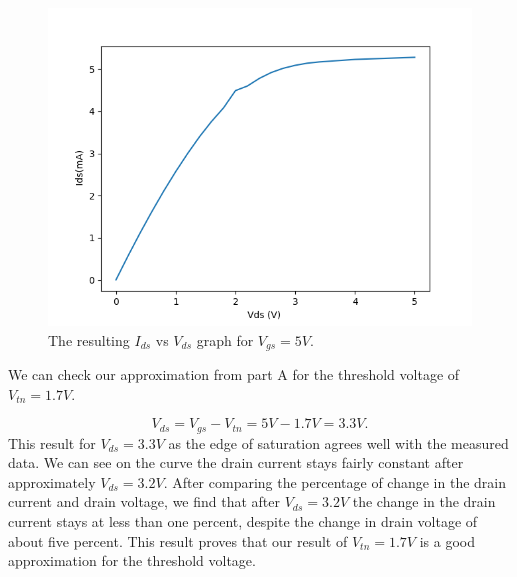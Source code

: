 		\begin{figure}[h!]
		\centering
		\includegraphics[scale=0.75]{./data/nmos_5v.png}
		\caption{The resulting $I_{ds}$ vs $V_{ds}$ graph for $V_{gs}=5V$.}
		\label{fig:nmos_5v}
		\end{figure}

		\FloatBarrier
		We can check our approximation from part A for the threshold voltage of $V_{tn} = 1.7 V$.
		
\begin{equation}
	\label{eq:thresh_5V}
		V_{ds} = V_{gs} - V_{tn} = 5 V - 1.7 V = 3.3 V.	
\end{equation}
This result for $V_{ds} = 3.3 V$ as the edge of saturation agrees well with the measured data. 
We can see on the curve the drain current stays fairly constant after approximately $V_{ds}=3.2 V$.
After comparing the percentage of change in the drain current and drain voltage, we find that after $V_{ds} = 3.2 V$ the change in the drain current stays at less than one percent, despite the change in drain voltage of about five percent. 
This result proves that our result of $V_{tn} = 1.7 V$ is a good approximation for the threshold voltage.

